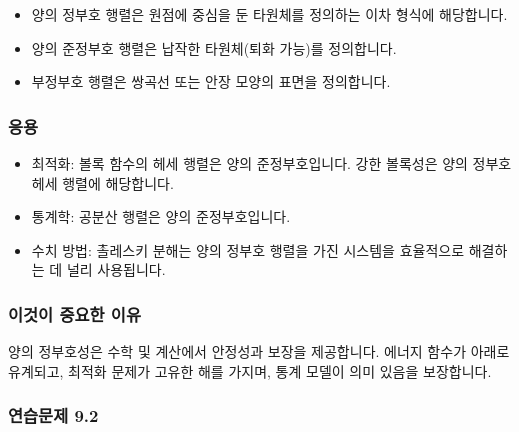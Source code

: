 \documentclass[
  12pt,
  a4paper,
]{article}
\begin{document}
\begin{itemize}
\item
  양의 정부호 행렬은 원점에 중심을 둔 타원체를 정의하는 이차 형식에 해당합니다.
\item
  양의 준정부호 행렬은 납작한 타원체(퇴화 가능)를 정의합니다.
\item
  부정부호 행렬은 쌍곡선 또는 안장 모양의 표면을 정의합니다.
\end{itemize}

\subsubsection{응용}\label{applications}

\begin{itemize}
\item
  최적화: 볼록 함수의 헤세 행렬은 양의 준정부호입니다. 강한 볼록성은 양의 정부호 헤세 행렬에 해당합니다.
\item
  통계학: 공분산 행렬은 양의 준정부호입니다.
\item
  수치 방법: 촐레스키 분해는 양의 정부호 행렬을 가진 시스템을 효율적으로 해결하는 데 널리 사용됩니다.
\end{itemize}

\subsubsection{이것이 중요한 이유}\label{why-this-matters-33}

양의 정부호성은 수학 및 계산에서 안정성과 보장을 제공합니다. 에너지 함수가 아래로 유계되고, 최적화 문제가 고유한 해를 가지며, 통계 모델이 의미 있음을 보장합니다.

\subsubsection{연습문제 9.2}\label{exercises-92}
\end{document}

